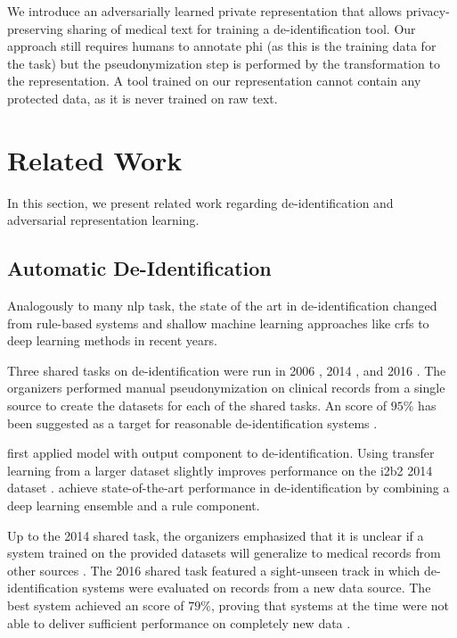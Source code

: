 %
We introduce an adversarially learned private representation that allows privacy-preserving sharing of medical text for training a de-identification tool.
%
Our approach still requires humans to annotate \ac{phi} (as this is the training data for the task) but the pseudonymization step is performed by the transformation to the representation.
%
A tool trained on our representation cannot contain any protected data, as it is never trained on raw text.

\section{Related Work}\label{sec:related}
%
In this section, we present related work regarding de-identification and adversarial representation learning.

\subsection{Automatic De-Identification}
%
Analogously to many \ac{nlp} task, the state of the art in de-identification changed from rule-based systems and shallow machine learning approaches like \acp{crf} \citep{uzuner2007evaluating,meystre2010automatic} to deep learning methods \citep{stubbs2017identification, dernoncourt2017identification, liu2017identification} in recent years.

%
Three shared tasks on de-identification were run in 2006 \citep{uzuner2007evaluating}, 2014 \citep{stubbs2015automated}, and 2016 \citep{stubbs2017identification}.
%
The organizers performed manual pseudonymization on clinical records from a single source to create the datasets for each of the shared tasks.
%
An \fone score of $95\%$ has been suggested as a target for reasonable de-identification systems \citep{stubbs2015automated}.

%
\citet{dernoncourt2017identification} first applied  \citep{hochreiter1997long} model with  output component to de-identification.
%
Using transfer learning from a larger dataset slightly improves performance on the i2b2 2014 dataset \citep{lee2017transfer}.
%
\citet{liu2017identification} achieve state-of-the-art performance in de-identification by combining a deep learning ensemble and a rule component.

%
Up to the 2014 shared task, the organizers emphasized that it is unclear if a system trained on the provided datasets will generalize to medical records from other sources \citep{uzuner2007evaluating,stubbs2015automated}.
%
The 2016 shared task featured a sight-unseen track in which de-identification systems were evaluated on records from a new data source.
%
The best system achieved an \fone score of $79\%$, proving that systems at the time were not able to deliver sufficient performance on completely new data \citep{stubbs2017identification}.

